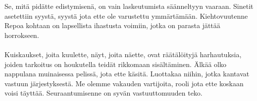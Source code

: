\documentclass{article}
\begin{document}
\begin{infobox}
Se, mitä pidätte edistymisenä, on vain laskeutumista säänneltyyn vaaraan. Sinetit asetettiin syystä, syystä jota ette ole varustettu ymmärtämään. Kiehtovuutenne Repoa kohtaan on lapsellista ihastusta voimiin, jotka on parasta jättää horrokseen.\\
\\
Kuiskaukset, joita kuulette, näyt, joita näette, ovat räätälöityjä harhautuksia, joiden tarkoitus on houkutella teidät rikkomaan sisältäminen. Älkää olko nappulana muinaisessa pelissä, jota ette käsitä. Luottakaa niihin, jotka kantavat vastuun järjestyksestä. Me olemme vakauden vartijoita, rooli jota ette koskaan voisi täyttää. Seuraantumisenne on syvän vastuuttomuuden teko.
\end{infobox}
\end{document}
